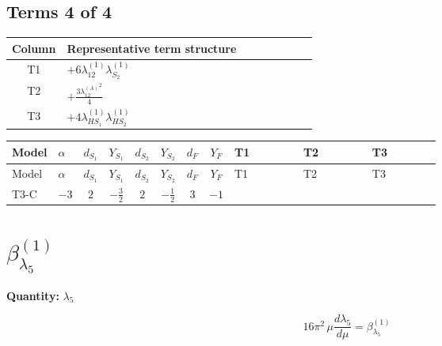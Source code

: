 \documentclass[8pt]{article}
\begin{document}
\begin{landscape}
\subsection*{Terms 4 of 4}
\begin{center}
\begin{tabular}{@{}c >{\raggedright\arraybackslash}p{0.82\linewidth}@{}}
\toprule
Column & Representative term structure \\
\midrule
T1 & \(\displaystyle +6 {\lambda_{12}^{(1)}} {\lambda_{S_2}^{(1)}}\) \\
\midrule
T2 & \(\displaystyle +\frac{3 {\lambda_{12}^{(A)}}^2}{4}\) \\
\midrule
T3 & \(\displaystyle +4 {\lambda_{HS_1}^{(1)}} {\lambda_{HS_2}^{(1)}}\) \\
\midrule
\bottomrule
\end{tabular}
\end{center}
\smallskip
\tiny
\begin{longtable}{@{}llcccccc >{\raggedright\arraybackslash}p{0.21\linewidth} >{\raggedright\arraybackslash}p{0.21\linewidth} >{\raggedright\arraybackslash}p{0.21\linewidth}@{}}
\toprule
Model & $\alpha$ & $d_{S_1}$ & $Y_{S_1}$ & $d_{S_2}$ & $Y_{S_2}$ & $d_F$ & $Y_F$ & T1 & T2 & T3 \\
\midrule
\endfirsthead
\toprule
Model & $\alpha$ & $d_{S_1}$ & $Y_{S_1}$ & $d_{S_2}$ & $Y_{S_2}$ & $d_F$ & $Y_F$ & T1 & T2 & T3 \\
\midrule
\endhead
T3-C & $-3$ & $2$ & $-\frac{3}{2}$ & $2$ & $-\frac{1}{2}$ & $3$ & $-1$ & \scriptsize\adjustbox{max width=\linewidth}{$\begin{gathered} +6 {\lambda_{12}^{(1)}} {\lambda_{S_2}^{(1)}}\end{gathered}$} & \scriptsize\adjustbox{max width=\linewidth}{$\begin{gathered} +\frac{3 {\lambda_{12}^{(A)}}^2}{4}\end{gathered}$} & \scriptsize\adjustbox{max width=\linewidth}{$\begin{gathered} +4 {\lambda_{HS_1}^{(1)}} {\lambda_{HS_2}^{(1)}}\end{gathered}$} \\
\midrule
\bottomrule
\end{longtable}
\clearpage
\section*{$\beta_{\lambda_5}^{(1)}$}
\noindent\textbf{Quantity: }$\lambda_5$\par\smallskip
\[16\pi^2\,\mu\frac{d \lambda_5}{d\mu}=\beta_{\lambda_5}^{(1)}\]

\end{landscape}
\end{document}
